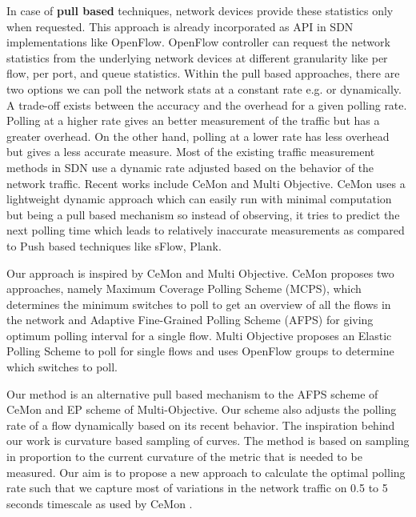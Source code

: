 In case of \textbf{pull based} techniques, network devices provide these statistics only when requested. This approach is already incorporated as API in SDN implementations like OpenFlow. OpenFlow controller can request the network statistics from the underlying network devices at different granularity like per flow, per port, and queue statistics. 
Within the pull based approaches, there are two options we can poll the network stats at a constant rate e.g. \cite{OpenTM} or dynamically. A trade-off exists between the accuracy and the overhead for a given polling rate. Polling at a higher rate gives an better measurement of the traffic but has a greater overhead. On the other hand, polling at a lower rate has less overhead but gives a less accurate measure. Most of the existing traffic measurement methods in SDN use a dynamic rate adjusted based on the behavior of the network traffic. Recent works include CeMon and Multi Objective.
CeMon uses a lightweight dynamic approach which can easily run with minimal computation but being a pull based mechanism so instead of observing, it tries to predict the next polling time which leads to relatively inaccurate measurements as compared to Push based techniques like sFlow\cite{sflow}, Plank\cite{plank}.

Our approach is inspired by CeMon\cite{CEMON} and Multi Objective\cite{momon}.
CeMon proposes two approaches, namely Maximum Coverage Polling Scheme (MCPS), which determines the minimum switches to poll to get an overview of all the flows in the network and Adaptive Fine-Grained Polling Scheme (AFPS) for giving optimum polling interval for a single flow. 
Multi Objective proposes an Elastic Polling Scheme to poll for single flows and uses OpenFlow groups to determine which switches to poll.


Our method is an alternative pull based mechanism to the AFPS scheme of CeMon and EP scheme of Multi-Objective.
Our scheme also adjusts the polling rate of a flow dynamically based on its recent behavior. 
The inspiration behind our work is curvature based sampling of curves\cite{curvature}.
The method is based on sampling in proportion to the current curvature of the metric that is needed to be measured.
Our aim is to propose a new approach to calculate the optimal polling rate such that we capture most of variations in
the network traffic on 0.5 to 5 seconds timescale as used by CeMon \cite{CEMON}.

